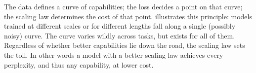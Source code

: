 The data defines a curve of capabilities; the loss decides a point on that curve; the scaling law determines the cost of that point.  illustrates this principle: models trained at different scales or for different lengths fall along a single (possibly noisy) curve. The curve varies wildly across tasks, but exists for all of them. Regardless of whether better capabilities lie down the road, the scaling law sets the toll. In other words a model with a better scaling law achieves every perplexity, and thus any capability, at lower cost.





